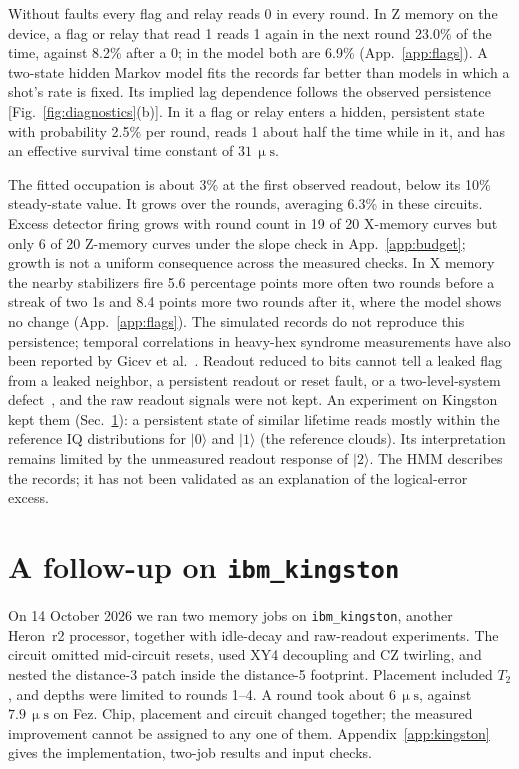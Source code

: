 \documentclass[aps,pra,reprint,nofootinbib,longbibliography,floatfix,showkeys]{revtex4-2}
\newcommand{\ket}[1]{\lvert #1\rangle}
\newcommand{\us}{\,\upmu\mathrm{s}}
\begin{document}
Without faults every flag and relay reads 0 in every round.
In Z memory on the device, a flag or relay that read 1 reads 1 again in the next round 23.0\% of the time, against 8.2\% after a 0; in the model both are 6.9\% (App.~\ref{app:flags}).
A two-state hidden Markov model fits the records far better than models in which a shot's rate is fixed.
Its implied lag dependence follows the observed persistence [Fig.~\ref{fig:diagnostics}(b)].
In it a flag or relay enters a hidden, persistent state with probability 2.5\% per round, reads 1 about half the time while in it, and has an effective survival time constant of $31\us$.

The fitted occupation is about 3\% at the first observed readout, below its 10\% steady-state value.
It grows over the rounds, averaging 6.3\% in these circuits.
Excess detector firing grows with round count in 19 of 20 X-memory curves but only 6 of 20 Z-memory curves under the slope check in App.~\ref{app:budget}; growth is not a uniform consequence across the measured checks.
In X memory the nearby stabilizers fire 5.6 percentage points more often two rounds before a streak of two 1s and 8.4 points more two rounds after it, where the model shows no change (App.~\ref{app:flags}).
The simulated records do not reproduce this persistence; temporal correlations in heavy-hex syndrome measurements have also been reported by Gicev et al.~\cite{gicev2024quantum}.
Readout reduced to bits cannot tell a leaked flag from a leaked neighbor, a persistent readout or reset fault, or a two-level-system defect~\cite{klimov2018fluctuations}, and the raw readout signals were not kept.
An experiment on Kingston kept them (Sec.~\ref{sec:kingston}): a persistent state of similar lifetime reads mostly within the reference IQ distributions for $\ket{0}$ and $\ket{1}$ (the reference clouds).
Its interpretation remains limited by the unmeasured readout response of $\ket{2}$.
The HMM describes the records; it has not been validated as an explanation of the logical-error excess.

\section{A follow-up on \texttt{ibm\_kingston}}
\label{sec:kingston}

On 14 October 2026 we ran two memory jobs on \texttt{ibm\_kingston}, another Heron~r2 processor, together with idle-decay and raw-readout experiments.
The circuit omitted mid-circuit resets, used XY4 decoupling and CZ twirling, and nested the distance-3 patch inside the distance-5 footprint.
Placement included $T_2$, and depths were limited to rounds 1--4.
A round took about $6\us$, against $7.9\us$ on Fez.
Chip, placement and circuit changed together; the measured improvement cannot be assigned to any one of them.
Appendix~\ref{app:kingston} gives the implementation, two-job results and input checks.
\end{document}
